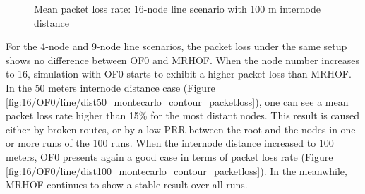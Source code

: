 \begin{figure}[p]
  \centering
    \leavevmode
  \caption{Mean packet loss rate: 16-node line scenario with 100 m internode distance}
  \label{fig:pl_16_line_100}
\end{figure}

For the 4-node and 9-node line scenarios, the packet loss under the same setup shows no difference between OF0 and MRHOF. When the node number increases to 16, simulation with OF0 starts to exhibit a higher packet loss than MRHOF. In the 50 meters internode distance case (Figure \ref{fig:16/OF0/line/dist50_montecarlo_contour_packetloss}), one can see a mean packet loss rate higher than 15\% for the most distant nodes. This result is caused either by broken routes, or by a low PRR between the root and the nodes in one or more runs of the 100 runs. When the internode distance increased to 100 meters, OF0 presents again a good case in terms of packet loss rate (Figure \ref{fig:16/OF0/line/dist100_montecarlo_contour_packetloss}). In the meanwhile, MRHOF continues to show a stable result over all runs.   
\newline 

